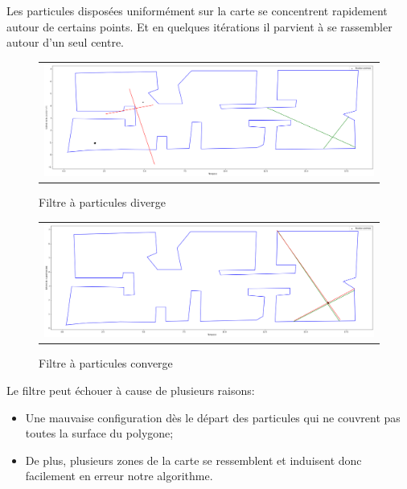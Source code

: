 \documentclass[11pt]{article}		%
\begin{document}
\noindent Les particules disposées uniformément sur la carte se concentrent rapidement autour de certains points. Et en quelques itérations il parvient à se rassembler autour d'un seul centre. \\

\vspace{0.3in}
\label{LFP}
\begin{figure}[ht]
 \begin{center}
  \begin{tabular}{c}
    \includegraphics[width=1.0\textwidth]{lfp_err.png} 
  \end{tabular}
 \end{center}
 \vspace{-0.3in}
 \caption{Filtre à particules diverge}
 \label{LFP}
\end{figure}

\vspace{0.3in}
\label{LFP}
\begin{figure}[ht]
 \begin{center}
  \begin{tabular}{c}
    \includegraphics[width=1.0\textwidth]{lfp_success.png} 
  \end{tabular}
 \end{center}
 \vspace{-0.3in}
 \caption{Filtre à particules converge}
 \label{LFP}
\end{figure}

\noindent Le filtre peut échouer à cause de plusieurs raisons: 
\begin{itemize}
\item Une mauvaise configuration dès le départ des particules qui ne couvrent pas toutes la surface du polygone;
\item De plus, plusieurs zones de la carte se ressemblent et induisent donc facilement en erreur notre algorithme.
\end{itemize}
\end{document}
